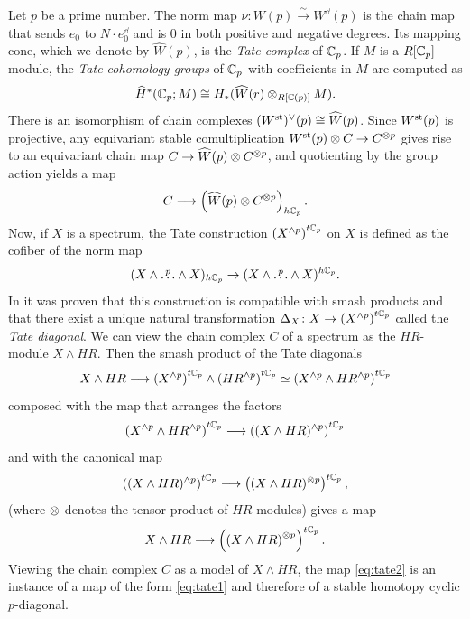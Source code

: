 \begin{remark}
Let $p$ be a prime number. The norm map $\nu \colon W(p) \xrightarrow{\sim} W^\dd(p)$ is the chain map that sends $e_0$ to $N \cdot e_0^\dd$ and is $0$ in both positive and negative degrees. Its mapping cone, which we denote by $\widehat W(p)$, is the \emph{Tate complex} of $\mathbb{C}_p$. If $M$ is a $R[\mathbb{C}_p]$-module, the \emph{Tate cohomology groups} of $\mathbb{C}_p$ with coefficients in $M$ are computed as 
\[
\widehat H^*(\mathbb{C}_p;M)
\cong 
H_*(\widehat W(r)\otimes_{R[\mathbb{C}(p)]}M).
\]
There is an isomorphism of chain complexes $(W^{\mathrm{st}}_{})^\vee(p)\cong \widehat W (p)$. Since $W^{\mathrm{st}}_{}(p)$ is projective, any equivariant stable comultiplication $W^{\mathrm{st}}_{}(p)\otimes C_{}\to C_{}^{\otimes p}$ gives rise to an equivariant chain map $C_{}\to \widehat W(p)\otimes C_{}^{\otimes p}$, and quotienting by the group action yields a map 
\begin{equation}\label{eq:tate1}
	C\longrightarrow \left(\widehat W(p)\otimes C_{}^{\otimes p}\right)_{h\mathbb{C}_p}.
\end{equation}
Now, if $X$ is a spectrum, the Tate construction $\left(X^{\wedge p}\right)^{t\mathbb{C}_p}$ on $X$ is defined as the cofiber of the norm map 
\[
(X\wedge \overset{p}{\dots} \wedge X)_{h\mathbb{C}_p}\to (X\wedge \overset{p}{\dots} \wedge X)^{h\mathbb{C}_p}.
\]
In \cite{Nikolaus-Scholze} it was proven that this construction is compatible with smash products and that there exist a unique natural transformation $\Delta_X\colon X\to \left(X^{\wedge p}\right)^{t\mathbb{C}_p}$ called the \emph{Tate diagonal}. We can view the chain complex $C$ of a spectrum as the $HR$-module $X\wedge HR$. Then the smash product of the Tate diagonals
\[
	X\wedge HR
	\longrightarrow
	\left(X^{\wedge p}\right)^{t\mathbb{C}_p}
	\wedge
	\left(HR^{\wedge p}\right)^{t\mathbb{C}_p}
	\simeq
	\left(X^{\wedge p}
	\wedge
	HR^{\wedge p}\right)^{t\mathbb{C}_p}
\]
composed with the map that arranges the factors
\[
\left(X^{\wedge p}
\wedge
HR^{\wedge p}\right)^{t\mathbb{C}_p}
\longrightarrow
\left((X\wedge HR)^{\wedge p}\right)^{t\mathbb{C}_p}
\]
and with the canonical map
\[
\left((X\wedge HR)^{\wedge p}\right)^{t\mathbb{C}_p}
\longrightarrow
\left((X\wedge HR)^{\otimes p}\right)^{t\mathbb{C}_p},
\]
(where $\otimes$ denotes the tensor product of $HR$-modules) gives a map
\begin{equation}\label{eq:tate2}
	X\wedge HR \longrightarrow \left(\left(X\wedge HR\right)^{\otimes p}\right)^{t\mathbb{C}_p}.
\end{equation}
Viewing the chain complex $C$ as a model of $X\wedge HR$, the map 
\eqref{eq:tate2} is an instance of a map of the form \eqref{eq:tate1} and therefore of a stable homotopy cyclic $p$-diagonal.
\end{remark}

